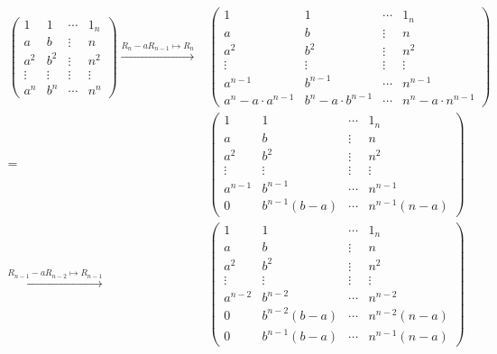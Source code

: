 \documentclass{report}
\begin{document}
{{		\begin{align*}
			\begin{pmatrix} 1 & 1 & \cdots & 1_{n} \\ a & b & \vdots & n \\ a^2 & b^2 & \vdots & n^2 \\ \vdots & \vdots & \vdots & \vdots \\ a^{n} &  b^{n} & \cdots & n^{n} \end{pmatrix} \xrightarrow{R_{n} - aR_{n - 1} \mapsto R_{n}} & \begin{pmatrix} 1 & 1 & \cdots & 1_{n} \\ a & b & \vdots & n \\ a^2 & b^2 & \vdots & n^2 \\ \vdots & \vdots & \vdots & \vdots \\ a^{n-1} &  b^{n-1} & \cdots & n^{n-1} \\ a^{n} - a \cdot a^{n-1} &  b^{n} - a \cdot b^{n-1} & \cdots & n^{n} - a \cdot n^{n-1} \end{pmatrix}             \\
			=                                                                                                                                                                                                                             & \begin{pmatrix} 1 & 1 & \cdots & 1_{n} \\ a & b & \vdots & n \\ a^2 & b^2 & \vdots & n^2 \\ \vdots & \vdots & \vdots & \vdots \\ a^{n-1} &  b^{n-1} & \cdots & n^{n-1} \\ 0 &  b^{n-1} (b - a) & \cdots & n^{n-1} (n - a) \end{pmatrix}                                                   \\
			\xrightarrow{R_{n-1} - aR_{n - 2} \mapsto R_{n-1}}                                                                                                                                                                            & \begin{pmatrix} 1 & 1 & \cdots & 1_{n} \\ a & b & \vdots & n \\ a^2 & b^2 & \vdots & n^2 \\ \vdots & \vdots & \vdots & \vdots \\ a^{n-2} &  b^{n-2} & \cdots & n^{n-2} \\ 0 & b^{n-2} (b - a) & \cdots & n^{n-2} (n - a) \\ 0 &  b^{n-1} (b - a) & \cdots & n^{n-1} (n - a) \end{pmatrix} \\
		\end{align*}

}}
\end{document}
